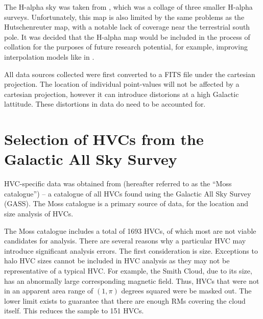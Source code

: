 The H-alpha sky was taken from \cite{ID43}, which was a collage of three smaller H-alpha surveys. Unfortunately, this map is also limited by the same problems as the Hutschenreuter map, with a notable lack of coverage near the terrestrial south pole. It was decided that the H-alpha map would be included in the process of collation for the purposes of future research potential, for example, improving interpolation models like in \cite{ID45, ID44}.


All data sources collected were first converted to a FITS file under the cartesian projection. The location of individual point-values will not be affected by a cartesian projection, however it can introduce distorions at a high Galactic lattitude. These distortions in data do need to be accounted for.


\section{Selection of HVCs from the Galactic All Sky Survey}
\label{sec:hvc_sel}

HVC-specific data was obtained from \cite{ID3} (hereafter referred to as the “Moss catalogue”) – a catalogue of all HVCs found using the Galactic All Sky Survey (GASS). The Moss catalogue is a primary source of data, for the location and size analysis of HVCs.


The Moss catalogue includes a total of 1693 HVCs, of which most are not viable candidates for analysis. There are several reasons why a particular HVC may introduce significant analysis errors. The first consideration is size. Exceptions to halo HVC sizes cannot be included in HVC analysis as they may not be representative of a typical HVC. For example, the Smith Cloud, due to its size, has an abnormally large corresponding magnetic field. Thus, HVCs that were not in an apparent area range of $(1,\pi)$ degrees squared were be masked out. The lower limit exists to guarantee that there are enough RMs covering the cloud itself. This reduces the sample to 151 HVCs.


